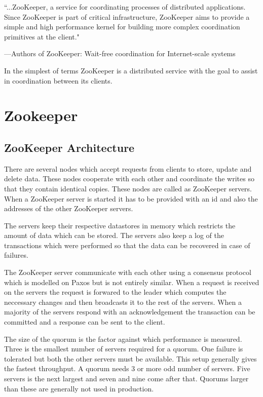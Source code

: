 \epigraph{``...ZooKeeper, a service for coordinating processes of distributed applications. Since ZooKeeper is part of critical infrastructure, ZooKeeper aims to provide a simple and high performance kernel for building more complex coordination primitives at the client."}{---Authors of \textup{ZooKeeper: Wait-free coordination for Internet-scale systems}}

    In the simplest of terms ZooKeeper is a distributed service with the goal to assist in coordination between its clients.

\chapter{Zookeeper}
\section{ZooKeeper Architecture}

There are several nodes which accept requests from clients to store, update and delete data. These nodes cooperate with each other and coordinate the writes so that they contain identical copies. These nodes are called as ZooKeeper servers. When a ZooKeeper server is started it has to be provided with an id and also the addresses of the other ZooKeeper servers. 

The servers keep their respective datastores in memory which restricts the amount of data which can be stored. The servers also keep a log of the transactions which were performed so that the data can be recovered in case of failures.



The ZooKeeper server communicate with each other using a consensus protocol which is modelled on Paxos but is not entirely similar. When a request is received on the servers the request is forwared to the leader which computes the neccessary changes and then broadcasts it to the rest of the servers. When a majority of the servers respond with an acknowledgement the transaction can be committed and a response can be sent to the client. 

The size of the quorum is the factor against which performance is measured. Three is the smallest number of servers required for a quorum. One failure is tolerated but both the other servers must be available. This setup generally gives the fastest throughput. A quorum needs 3 or more odd number of servers. Five servers is the next largest and seven and nine come after that. Quorums larger than these are generally not used in production.

